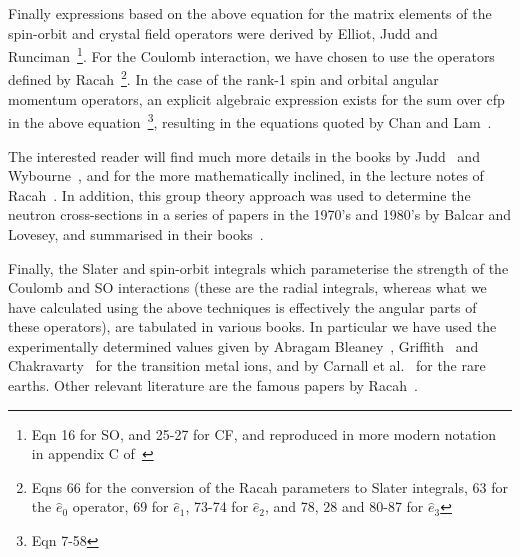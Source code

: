 Finally expressions based on the above equation for the matrix elements of the spin-orbit and
crystal field operators were derived by Elliot, Judd and Runciman~\cite{elliot57-509}\footnote{Eqn
16 for SO, and 25-27 for CF, and reproduced in more modern notation in appendix C
of~\cite{ducle09-1}}. For the Coulomb interaction, we have chosen to use the operators defined by
Racah~\cite{racah49-1352}\footnote{Eqns 66 for the conversion of the Racah parameters to Slater
integrals, 63 for the $\hat e_0$ operator, 69 for $\hat e_1$, 73-74 for $\hat e_2$, and 78, 28 and 80-87 for
$\hat e_3$}. In the case of the rank-1 spin and orbital angular momentum operators, an explicit algebraic
expression exists for the sum over cfp in the above equation~\cite{judd88-1}\footnote{Eqn 7-58},
resulting in the equations quoted by Chan and Lam~\cite{chan70-219}.

The interested reader will find much more details in the books by Judd~\cite{judd88-1} and
Wybourne~\cite{wybourne65}, and for the more mathematically inclined, in the lecture notes of
Racah~\cite{racah51}. In addition, this group theory approach was used to determine the neutron
cross-sections in a series of papers in the 1970's and 1980's by Balcar and Lovesey, and summarised
in their books~\cite{lovesey84-1,balcar89-1}.

Finally, the Slater and spin-orbit integrals which parameterise the strength of the Coulomb and SO
interactions (these are the radial integrals, whereas what we have calculated using the above
techniques is effectively the angular parts of these operators), are tabulated in various books. In
particular we have used the experimentally determined values given by Abragam
Bleaney~\cite{abragam70-1}, Griffith~\cite{griffith71-1} and Chakravarty~\cite{chakravarty80-1} for
the transition metal ions, and by Carnall et al.~\cite{carnall89,carnall92} for the rare earths.
Other relevant literature are the famous papers by Racah~\cite{racah42-186,racah42-438,racah43-367}.

